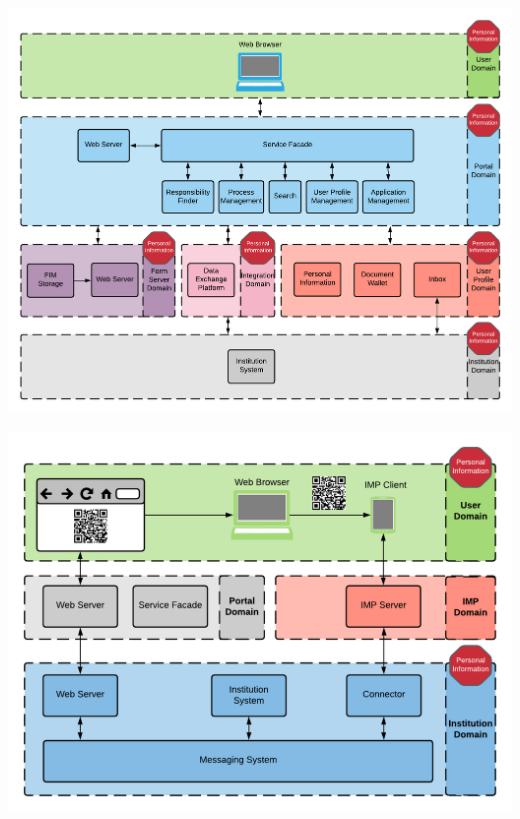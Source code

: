 \begin{center}
    \includegraphics[scale=0.6]{Diagrams/Integration Architecture 2/OZG Personal Information.pdf}
\end{center}

\begin{center}
    \includegraphics[scale=0.6]{Diagrams/Integration Architecture 2/IMP Personal Information.pdf}
\end{center}